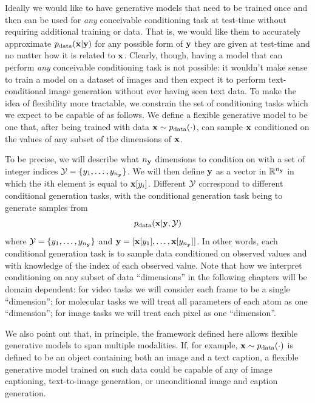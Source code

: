 Ideally we would like to have generative models that need to be trained once and then can be used for \textit{any} conceivable conditioning task at test-time without requiring additional training or data. That is, we would like them to accurately approximate $p_{\rm{data}}({\mathbf{x}}|{\mathbf{y}})$ for any possible form of ${\mathbf{y}}$ they are given at test-time and no matter how it is related to ${\mathbf{x}}$. Clearly, though, having a model that can perform \textit{any} conceivable conditioning task is not possible: it wouldn't make sense to train a model on a dataset of images and then expect it to perform text-conditional image generation without ever having seen text data. 
%
To make the idea of flexibility more tractable, we constrain the set of conditioning tasks which we expect to be capable of as follows. We define a flexible generative model to be one that, after being trained with data ${\mathbf{x}} \sim p_{\rm{data}}(\cdot)$, can sample ${\mathbf{x}}$ conditioned on the values of any subset of the dimensions of ${\mathbf{x}}$. 

To be precise, we will describe what $n_{\mathbf{y}}$ dimensions to condition on with a set of integer indices ${\mathcal{Y}} = \{ y_1, \ldots, y_{n_{\mathbf{y}}} \}$. We will then define ${\mathbf{y}}$ as a vector in $\mathbb{R}^{n_{\mathbf{y}}}$ in which the $i$th element is equal to ${\mathbf{x}}[y_i]$. Different ${\mathcal{Y}}$ correspond to different conditional generation tasks, with the conditional generation task being to generate samples from
\begin{equation} \label{eq:flexible-diffusion-target}
    p_{\rm{data}}({\mathbf{x}} | {\mathbf{y}}, {\mathcal{Y}})
\end{equation}
where ${\mathcal{Y}} = \{ y_1, \ldots, y_{n_{\mathbf{y}}} \}$ and ${\mathbf{y}} = [ {\mathbf{x}}[y_1], \ldots, {\mathbf{x}}[y_{n_{\mathbf{y}}}] ]$. In other words, each conditional generation task is to sample data conditioned on observed values and with knowledge of the index of each observed value. Note that how we interpret conditioning on any subset of data ``dimensions'' in the following chapters will be domain dependent: for video tasks we will consider each frame to be a single ``dimension''; for molecular tasks we will treat all parameters of each atom as one ``dimension''; for image tasks we will treat each pixel as one ``dimension''. 

We also point out that, in principle, the framework defined here allows flexible generative models to span multiple modalities. If, for example, ${\mathbf{x}} \sim p_{\rm{data}}(\cdot)$ is defined to be an object containing both an image and a text caption, a flexible generative model trained on such data could be capable of any of image captioning, text-to-image generation, or unconditional image and caption generation.

